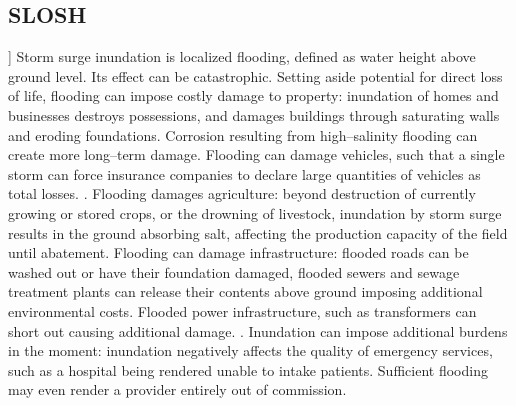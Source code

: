 
\subsection{SLOSH}]
Storm surge inundation is localized flooding, defined as water height above
    ground level.  Its effect can be catastrophic.  Setting aside potential 
    for direct loss of life, 
    flooding can impose costly damage to property: inundation of homes and 
    businesses destroys possessions, and damages buildings through saturating 
    walls and eroding foundations.  Corrosion resulting from high--salinity 
    flooding can create more long--term  damage.\needcite  
    Flooding can damage vehicles, such that a single storm can force insurance 
    companies to declare large quantities of vehicles as total losses. 
    \needcite.  Flooding damages agriculture: beyond 
    destruction of currently growing or stored crops, or the drowning of 
    livestock, inundation by storm surge results in the ground absorbing salt, 
    affecting the production capacity of the field until abatement. Flooding can
    damage infrastructure: flooded roads can be washed out or have their 
    foundation damaged, flooded sewers and sewage treatment plants can release 
    their contents above ground imposing additional environmental costs.  
    Flooded power infrastructure, such as transformers can short out causing 
    additional damage. \citep{hutchings2021}.  Inundation can impose additional 
    burdens in the moment:  inundation negatively affects the quality of 
    emergency services, such as a hospital being rendered unable to intake 
    patients.  Sufficient flooding may even render a provider entirely out of 
    commission.

